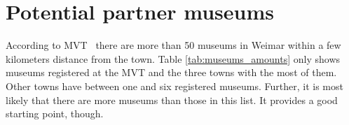 %


\section{Potential partner museums}
\label{partnering_investigation}

According to \ac{MVT}~\cite{ThueringerMuseumsverbandOrte} there are more than 50  museums in Weimar within a few kilometers distance from the town. Table \ref{tab:museums_amounts} only shows museums registered at the \ac{MVT} and the three towns with the most of them. Other towns have between one and six registered museums. Further, it is most likely that there are more museums than those in this list. It provides a good starting point, though.

